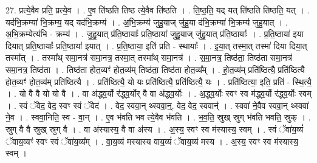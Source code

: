 \documentclass[17pt]{extarticle}
\begin{document}
27. प्रत्ये॒वैव प्रति॒ प्रत्ये॒व । . ए॒व ति॑ष्ठति तिष्ठ त्ये॒वैव ति॑ष्ठति । . ति॒ष्ठ॒ति॒ यद् यत् ति॑ष्ठति तिष्ठति॒ यत् । . यद॑भि॒क्रम्या॑ भि॒क्रम्य॒ यद् यद॑भि॒क्रम्य॑ । . अ॒भि॒क्रम्य॑ जुहु॒याज् जु॑हु॒या द॑भि॒क्रम्या॑ भि॒क्रम्य॑ जुहु॒यात् । . अ॒भि॒क्रम्येत्य॑भि - क्रम्य॑ । . जु॒हु॒यात् प्र॑ति॒ष्ठायाः᳚ प्रति॒ष्ठाया॑ जुहु॒याज् जु॑हु॒यात् प्र॑ति॒ष्ठायाः᳚ । . प्र॒ति॒ष्ठाया॑ इया दियात् प्रति॒ष्ठायाः᳚ प्रति॒ष्ठाया॑ इयात् । . प्र॒ति॒ष्ठाया॒ इति॑ प्रति - स्थायाः᳚ । . इ॒या॒त् तस्मा॒त् तस्मा॑ दिया दिया॒त् तस्मा᳚त् । . तस्मा᳚थ् समा॒नत्र॑ समा॒नत्र॒ तस्मा॒त् तस्मा᳚थ् समा॒नत्र॑ । . स॒मा॒नत्र॒ तिष्ठ॑ता॒ तिष्ठ॑ता समा॒नत्र॑ समा॒नत्र॒ तिष्ठ॑ता । . तिष्ठ॑ता होत॒व्यꣳ॑ होत॒व्य॑म् तिष्ठ॑ता॒ तिष्ठ॑ता होत॒व्य᳚म् । . हो॒त॒व्य॑म् प्रति॑ष्ठित्यै॒ प्रति॑ष्ठित्यै होत॒व्यꣳ॑ होत॒व्य॑म् प्रति॑ष्ठित्यै । . प्रति॑ष्ठित्यै॒ यो यः प्रति॑ष्ठित्यै॒ प्रति॑ष्ठित्यै॒ यः । . प्रति॑ष्ठित्या॒ इति॒ प्रति॑ - स्थि॒त्यै॒ । . यो वै वै यो यो वै । . वा अ॑द्ध्व॒र्यो र॑द्ध्व॒र्योर् वै वा अ॑द्ध्व॒र्योः । . अ॒द्ध्व॒र्योः स्वꣳ स्व म॑द्ध्व॒र्यो र॑द्ध्व॒र्योः स्वम् । . स्वं ॅवेद॒ वेद॒ स्वꣳ स्वं ॅवेद॑ । . वेद॒ स्ववा॒न् थ्स्ववा॒न्॒. वेद॒ वेद॒ स्ववान्॑ । . स्ववा॑ ने॒वैव स्ववा॒न् थ्स्ववा॑ ने॒व । . स्ववा॒निति॒ स्व - वा॒न् । . ए॒व भ॑वति भव त्ये॒वैव भ॑वति । . भ॒व॒ति॒ स्रुख् स्रुग् भ॑वति भवति॒ स्रुक् । . स्रुग् वै वै स्रुख् स्रुग् वै । . वा अ॑स्यास्य॒ वै वा अ॑स्य । . अ॒स्य॒ स्वꣳ स्व म॑स्यास्य॒ स्वम् । . स्वं ॅवा॑य॒व्यं॑ ॅवाय॒व्यꣳ॑ स्वꣳ स्वं ॅवा॑य॒व्य᳚म् । . वा॒य॒व्य॑ मस्यास्य वाय॒व्यं॑ ॅवाय॒व्य॑ मस्य । . अ॒स्य॒ स्वꣳ स्व म॑स्यास्य॒ स्वम् । \newline
\pagebreak
{}
\end{document}
